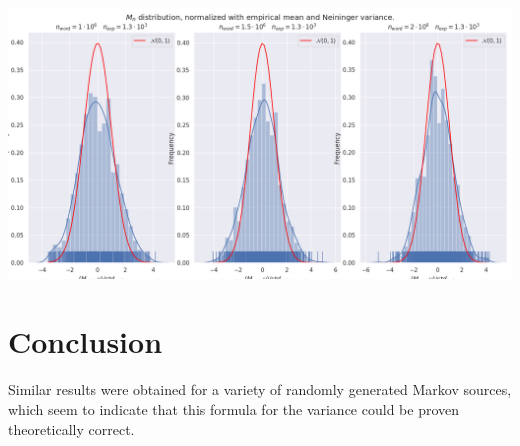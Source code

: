 \noindent
 	 \begin{minipage}{\textwidth}
        \includegraphics[width = \textwidth,
        				    trim = 0 0.5cm 0 0,
        				    	clip=true]{./figs/eig_fig3.png}	
	\end{minipage} 


\section{Conclusion}
Similar results were obtained for a variety of randomly generated Markov sources,
which seem to indicate that this formula for the variance could be proven theoretically
correct. 

